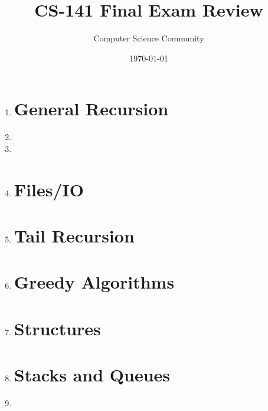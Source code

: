 \documentclass[11pt]{article}
\author{Computer Science Community}
\title{CS-141 Final Exam Review}
\date{\today}
\begin{document}
\header

\begin{enumerate}

\section*{Python Basics}
	\item 

\section*{General Recursion}
	\item 

\newpage
	\item 

	\item 

\vspace{.5in}
\section*{Files/IO}
	\item 

\newpage
\section*{Tail Recursion}
	\item 

\section*{Greedy Algorithms}
	\item 

\newpage
\section*{Structures}
	\item 

\newpage
\section*{Stacks and Queues}
	\item 


\end{enumerate}
\end{document}
